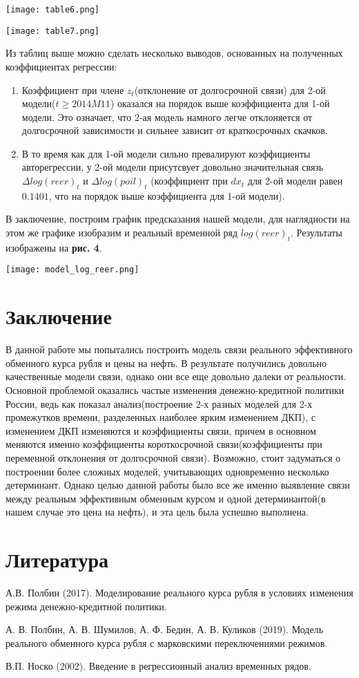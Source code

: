 \documentclass{article}
\begin{document}
\begin{center}
\texttt{[image: table6.png]}
\end{center}

\begin{center}
\texttt{[image: table7.png]}
\end{center}

Из таблиц выше можно сделать несколько выводов, основанных на полученных коэффициентах регрессии:
\begin{enumerate}
\item Коэффициент при члене $z_t$(отклонение от долгосрочной связи) для 2-ой модели($t\geq 2014M11$) оказался на порядок выше коэффициента для 1-ой модели. Это означает, что 2-ая модель намного легче отклоняется от долгосрочной зависимости и сильнее зависит от краткосрочных скачков.
\item В то время как для 1-ой модели сильно превалируют коэффициенты авторегрессии, у 2-ой модели присутсвует довольно значительная связь $\Delta log(reer)_t$ и $\Delta log(poil)_t$ (коэффициент при $dx_t$ для 2-ой модели равен $0.1401$, что на порядок выше коэффициента для 1-ой модели).
\end{enumerate}

В заключение, построим график предсказания нашей модели, для наглядности на этом же графике изобразим и реальный временной ряд $log(reer)_t$. Результаты изображены на \textbf{рис. 4}.

\begin{center}
\texttt{[image: model\_log\_reer.png]}
\end{center}

\section{Заключение}
В данной работе мы попытались построить модель связи реального эффективного обменного курса рубля и цены на нефть. В результате получились довольно качественные модели связи, однако они все еще довольно далеки от реальности. Основной проблемой оказались частые изменения денежно-кредитной политики России, ведь как показал анализ(построение 2-х разных моделей для 2-х промежутков времени, разделенных наиболее ярким изменением ДКП), с изменением ДКП изменяются и коэффициенты связи, причем в основном меняются именно коэффициенты короткосрочной связи(коэффициенты при переменной отклонения от долгосрочной связи). Возможно, стоит задуматься о построении более сложных моделей, учитывающих одновременно несколько детерминант. Однако целью данной работы было все же именно выявление связи между реальным эффективным обменным курсом и одной детерминантой(в нашем случае это цена на нефть), и эта цель была успешно выполнена.
\section{Литература}
А.В. Полбин (2017). Моделирование реального курса рубля в условиях изменения режима денежно-кредитной политики.

А. В. Полбин, А. В. Шумилов, А. Ф. Бедин, А. В. Куликов (2019). Модель реального обменного курса рубля с марковскими переключениями режимов.

В.П. Носко (2002). Введение в регрессионный анализ временных рядов.
\end{document}
